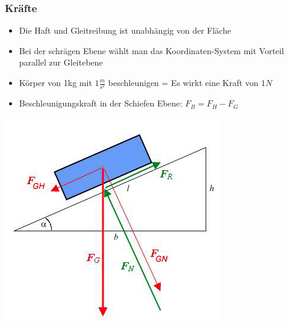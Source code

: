 \subsubsection{Kräfte}

\begin{itemize}
	\item Die Haft und Gleitreibung ist unabhängig von der Fläche
	\item Bei der schrägen Ebene wählt man das  Koordinaten-System mit Vorteil parallel zur Gleitebene
	\item Körper von 1kg mit $1\frac{m}{s^2}$ beschleunigen = Es wirkt eine Kraft von $1N$
	\item Beschleunigungskraft in der Schiefen Ebene: $F_B = F_H - F_G$
\end{itemize}

\begin{minipage}[h!]{0.3\linewidth}
\includegraphics[width=0.9\linewidth]{images/schiefe_ebene}
\end{minipage}
\hfill
